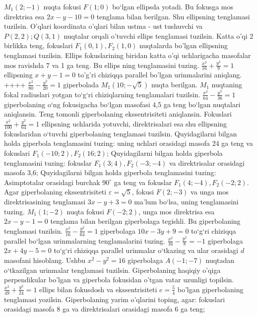 $M_1 (2;-1)$ nuqta fokusi $F (1;0)$ bo‘lgan ellipsda yotadi. Bu fokusga mos direktrisa esa $2x-y-10=0$ tenglama bilan berilgan. Shu ellipsning tenglamasi tuzilsin.
O'qlari koordinata o'qlari bilan ustma - ust tushuvchi va $P(2,2) ; Q(3,1)$ nuqtalar orqali o'tuvchi ellips tenglamasi tuzilsin.
Katta o'qi 2 birlikka teng, fokuslari $F_1(0,1), F_2(1,0)$ nuqtalarda bo'lgan ellipsning tenglamasi tuzilsin.
Ellips fokuslarining biridan katta o'qi uchlarigacha masofalar mos ravishda 7 va 1 ga teng. Bu ellips ning tenglamasini tuzing.
$\frac{x^2}{16}+\frac{y^2}{9}=1$ ellipsning $x+y-1=0$ to'g'ri chiziqqa parallel bo'lgan urinmalarini aniqlang.
++++
$\frac{x^2}{80}-\frac{y^2}{20}=1$ giperbolada $M_1 (10;-\sqrt{5}) $ nuqta berilgan. $M_1$ nuqtaning fokal radiuslari yotgan to‘g‘ri chiziqlarning tenglamalari tuzilsin.
$\frac{x^2}{64}-\frac{y^2}{36}=1$ giperbolaning o‘ng fokusigacha bo‘lgan masofasi 4,5 ga teng bo‘lgan nuqtalari aniqlansin.
Teng tomonli giperbolaning ekssentrisiteti aniqlansin.
Fokuslari $\frac{x^2}{100}+\frac{y^2}{64}=1$ ellipsning uchlarida yotuvchi, direktrisalari esa shu ellipsning fokuslaridan o‘tuvchi giperbolaning tenglamasi tuzilsin.
Quyidagilarni bilgan holda giperbola tenglamasini tuzing: uning uchlari orasidagi masofa 24 ga teng va fokuslari $F_1 (-10; 2), F_2 (16; 2) $;
Quyidagilarni bilgan holda giperbola tenglamasini tuzing: fokuslar $F_1 (3; 4), F_2 (-3;-4)$ va direktrisalar orasidagi masofa 3,6;
Quyidagilarni bilgan holda giperbola tenglamasini tuzing: Asimptotalar orasidagi burchak $90^{\circ}$ ga teng va fokuslar $F_1 (4;-4), F_2 (-2; 2) $.
Agar giperbolaning ekssentrisiteti $\varepsilon=\sqrt{5}$, fokusi $F (2;-3) $ va unga mos direktrisasining tenglamasi $3 x-y+3=0$ ma’lum bo‘lsa, uning tenglamasini tuzing.
$M_1 (1;-2) $ nuqta fokusi $F (-2; 2) $, unga mos direktrisa esa $2x-y-1=0$ tenglama bilan berilgan giperbolaga tegishli. Bu giperbolaning tenglamasi tuzilsin.
$\frac{x^2}{16}-\frac{y^2}{64}=1$ giperbolaga $10 x-3 y+9=0$ to‘g‘ri chiziqqa parallel bo‘lgan urinmalarning tenglamalarini tuzing.
$\frac{x^2}{16}-\frac{y^2}{8}=-1$ giperbolaga $2 x+4 y-5=0$ to‘g‘ri chiziqqa parallel urinmalar o‘tkazing va ular orasidagi $d$ masofani hisoblang.
Ushbu $x^2-y^2=16$ giperbolaga $A (-1;-7)$ nuqtadan o‘tkazilgan urinmalar tenglamasi tuzilsin.
Giperbolaning haqiqiy o'qiga perpendikular bo'lgan va giperbola fokusidan o'tgan vatar uzunligi topilsin.
$\frac{x^2}{49}+\frac{y^2}{24}=1$ ellips bilan fokusdosh va ekssentrisiteti $e=\frac{5}{4}$ bo'lgan giperbolaning tenglamasi yozilsin.
Giperbolaning yarim o'qlarini toping, agar: fokuslari orasidagi masofa 8 ga va direktrisalari orasidagi masofa 6 ga teng;
